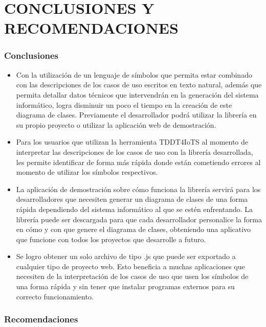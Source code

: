 \setcounter{chapter}{5}
\setcounter{section}{0}
\part{CONCLUSIONES Y RECOMENDACIONES}

\section{Conclusiones}

\begin{itemize}
	\item Con la utilización de un lenguaje de símbolos que permita estar combinado con las descripciones de los casos de uso escritos en texto natural, además que permita detallar datos técnicos que intervendrán en la generación del sistema informático, logra disminuir un poco el tiempo en la creación de este diagrama de clases. Previamente el desarrollador podrá utilizar la librería en su propio proyecto o utilizar la aplicación web de demostración.
	\item Para los usuarios que utilizan la herramienta TDDT4IoTS al momento de interpretar las descripciones de los casos de uso con la librería desarrollada, les permite identificar de forma más rápida donde están cometiendo errores al momento de utilizar los símbolos respectivos.
	\item La aplicación de demostración sobre cómo funciona la librería servirá para los desarrolladores que necesiten generar un diagrama de clases de una forma rápida dependiendo del sistema informático al que se estén enfrentando. La librería puede ser descargada para que cada desarrollador personalice la forma en cómo y con que genere el diagrama de clases, obteniendo una aplicativo que funcione con todos los proyectos que desarrolle a futuro.   
	\item Se logro obtener un solo archivo de tipo .js que puede ser exportado a cualquier tipo de proyecto web. Esto beneficia a muchas aplicaciones que necesiten de la interpretación de los casos de uso que usen los símbolos de una forma rápida y sin tener que instalar programas externos para su correcto funcionamiento.
\end{itemize}

\newpage
\section{Recomendaciones}
	
